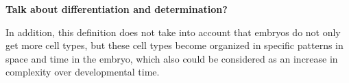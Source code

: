 \textbf{Talk about differentiation and determination?}

 
In addition, this definition does not take into account that embryos do not only get more cell types, but these cell types become organized in specific patterns in space and time in the embryo, which also could be considered as an increase in complexity over developmental time.

%
%
%
%


